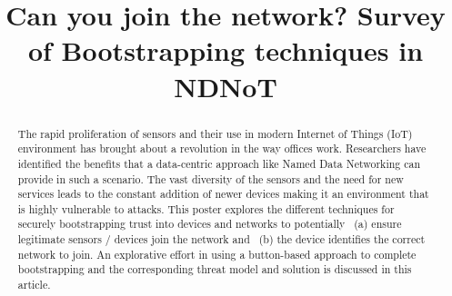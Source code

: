 \documentclass[10pt,sigconf]{acmart}
\begin{document}
\title{Can you join the network? Survey of Bootstrapping techniques in NDNoT}









\begin{abstract}

  The rapid proliferation of sensors and their use in modern Internet of Things (IoT) environment has brought about a revolution in the way offices work.
  Researchers have identified the benefits that a data-centric approach like Named Data Networking can provide in such a scenario.
  The vast diversity of the sensors and the need for new services leads to the constant addition of newer devices making it an environment that is highly vulnerable to attacks. 
  This poster explores the different techniques for securely bootstrapping trust into devices and networks to potentially ~(a) ensure legitimate sensors / devices join the network and ~(b) the device identifies the correct network to join.
  An explorative effort in using a button-based approach to complete bootstrapping and the corresponding threat model and solution is discussed in this article.
  
\end{abstract}
\end{document}
